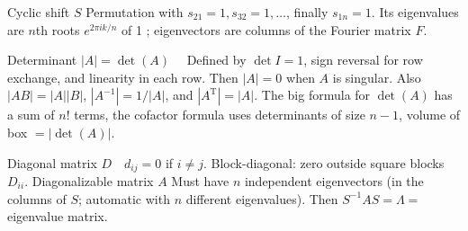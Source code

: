 Cyclic shift $S$ Permutation with $s_{21}=1, s_{32}=1, \ldots$, finally $s_{1 n}=1$. Its eigenvalues are $n$th roots $e^{2 \pi i k / n}$ of 1 ; eigenvectors are columns of the Fourier matrix $F$.

Determinant $|A|=\operatorname{det}(A) \quad$ Defined by $\operatorname{det} I=1$, sign reversal for row exchange, and linearity in each row. Then $|A|=0$ when $A$ is singular. Also $|A B|=|A||B|$, $\left|A^{-1}\right|=1 /|A|$, and $\left|A^{\mathrm{T}}\right|=|A|$. The big formula for $\operatorname{det}(A)$ has a sum of $n!$ terms, the cofactor formula uses determinants of size $n-1$, volume of box $=|\operatorname{det}(A)|$.

Diagonal matrix $D \quad d_{i j}=0$ if $i \neq j$. Block-diagonal: zero outside square blocks $D_{i i}$.
Diagonalizable matrix $A$ Must have $n$ independent eigenvectors (in the columns of $S$; automatic with $n$ different eigenvalues). Then $S^{-1} A S=\Lambda=$ eigenvalue matrix.
